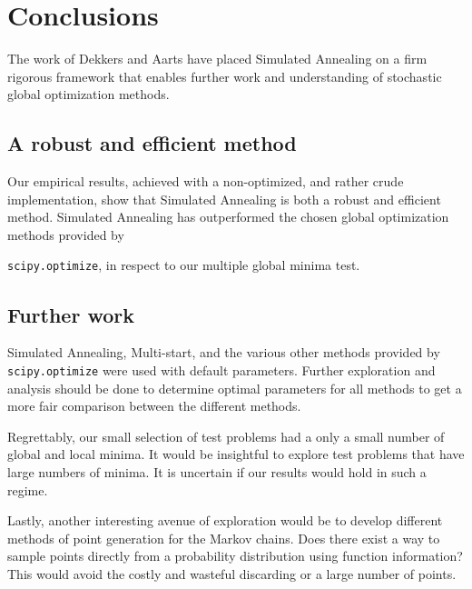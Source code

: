 \section{Conclusions}
\label{sec:conclusions}

The work of Dekkers and Aarts have placed Simulated Annealing on a firm rigorous framework that enables further
work and understanding of stochastic global optimization methods.

\subsection{A robust and efficient method}

Our empirical results, achieved with a non-optimized, and rather
crude implementation, show that Simulated Annealing is both a robust and efficient method. Simulated Annealing has
outperformed the chosen global optimization methods provided by

\noindent\texttt{scipy.optimize}, in respect to our multiple
global minima test.

\subsection{Further work}

Simulated Annealing, Multi-start, and the various other methods provided by \texttt{scipy.optimize} were used with
default parameters. Further exploration and analysis should be done to determine optimal parameters for all methods 
to get a more fair comparison between the different methods.

Regrettably, our small selection of test problems had a only a small number of global and local minima. It would be
insightful to explore test problems that have large numbers of minima. It is uncertain if our results would hold
in such a regime.

Lastly, another interesting avenue of exploration would be to develop different methods of point generation for the
Markov chains. Does there exist a way to sample points directly from a probability distribution using function information?
This would avoid the costly and wasteful discarding or a large number of points.
